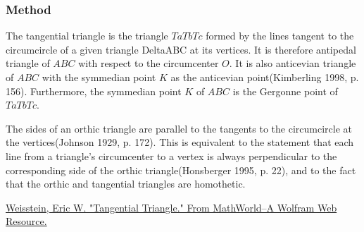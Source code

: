 \subsubsection{Method } %
\label{ssub:method_triangle_tangential}

The tangential triangle is the triangle $TaTbTc$ formed by the lines tangent to the circumcircle of a given triangle DeltaABC at its vertices. It is therefore antipedal triangle of $ABC$ with respect to the circumcenter $O$. It is also anticevian triangle of $ABC$ with the symmedian point $K$ as the anticevian point(Kimberling 1998, p. 156). Furthermore, the symmedian point $K$ of $ABC$ is the Gergonne point of $TaTbTc$.

The sides of an orthic triangle are parallel to the tangents to the circumcircle at the vertices(Johnson 1929, p. 172). This is equivalent to the statement that each line from a triangle's circumcenter to a vertex is always perpendicular to the corresponding side of the orthic triangle(Honsberger 1995, p. 22), and to the fact that the orthic and tangential triangles are homothetic.\begin{flushright}
  \small
\href{https://mathworld.wolfram.com/TangentialTriangle.html}{Weisstein, Eric W. "Tangential Triangle." From MathWorld--A Wolfram Web Resource.}
\end{flushright}

\vspace{1em}
\begin{minipage}{.5\textwidth}
\begin{center}
\end{center}

\end{minipage}
\begin{minipage}{.5\textwidth}
\begin{tkzexample}
\end{tkzexample}
\end{minipage}

